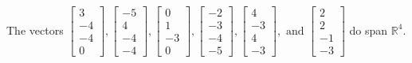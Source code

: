 \begin{exercise}
\begin{exerciseStatement}
  \end{exerciseStatement}
  \begin{exerciseAnswer}
   The vectors \(\left[\begin{array}{r}
3 \\
-4 \\
-4 \\
0
\end{array}\right] , \left[\begin{array}{r}
-5 \\
4 \\
-4 \\
-4
\end{array}\right] , \left[\begin{array}{r}
0 \\
1 \\
-3 \\
0
\end{array}\right] , \left[\begin{array}{r}
-2 \\
-3 \\
-4 \\
-5
\end{array}\right] , \left[\begin{array}{r}
4 \\
-3 \\
4 \\
-3
\end{array}\right] , \text{ and } \left[\begin{array}{r}
2 \\
2 \\
-1 \\
-3
\end{array}\right]\) 
  	 do  
	span \(\mathbb{R}^4\).
  


  \end{exerciseAnswer}
\end{exercise}